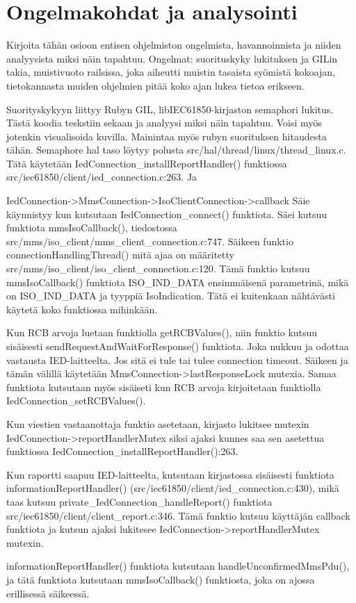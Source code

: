 \section{Ongelmakohdat ja analysointi}
\begin{it}
	Kirjoita tähän osioon entisen ohjelmiston ongelmista, havannoinnista ja niiden analyysista miksi näin tapahtuu.
	Ongelmat: suorituskyky lukituksen ja GILin takia, muistivuoto railsissa, joka aiheutti muistin tasaista syömistä kokoajan, tietokannasta muiden ohjelmien pitää koko ajan lukea tietoa erikseen.

	Suorityskykyyn liittyy Rubyn GIL, libIEC61850-kirjaston semaphori lukitus. Tästä koodia teskstiin sekaan ja analyysi miksi näin tapahtuu. Voisi myös jotenkin visualisoida kuvilla. Mainintaa myös rubyn suorituksen hitaudesta tähän.
	Semaphore hal taso löytyy polusta src/hal/thread/linux/thread\_linux.c.
	Tätä käytetään IedConnection\_installReportHandler() funktiossa src/iec61850/client/ied\_connection.c:263. Ja 

	IedConnection->MmsConnection->IsoClientConnection->callback
	Säie käynnistyy kun kutsutaan IedConnection\_connect() funktiota. Säei kutsuu funktiota mmsIsoCallback(), tiedostossa src/mms/iso\_client/mms\_client\_connection.c:747.
	Säikeen funktio connectionHandlingThread() mitä ajaa on määritetty src/mms/iso\_client/iso\_client\_connection.c:120.
	Tämä funktio kutsuu mmsIsoCallback() funktiota ISO\_IND\_DATA ensimmäisenä parametrinä, mikä on ISO\_IND\_DATA ja tyyppiä IsoIndication. Tätä ei kuitenkaan nähtävästi käytetä koko funktiossa mihinkään.

	Kun RCB arvoja luetaan funktiolla getRCBValues(), niin funktio kutsuu sisäisesti sendRequestAndWaitForResponse() funktiota. Joka nukkuu ja odottaa vastausta IED-laitteelta. Jos sitä ei tule tai tulee connection timeout. Säikeen ja tämän välillä käytetään MmsConnection->lastResponseLock mutexia. Samaa funktiota kutsutaan myös sisäiseti kun RCB arvoja kirjoitetaan funktiolla IedConnection\_setRCBValues().

	Kun viestien vastaanottaja funktio asetetaan, kirjasto lukitsee mutexin IedConnection->reportHandlerMutex siksi ajaksi kunnes saa sen asetettua funktiossa IedConnection\_installReportHandler():263.

	Kun raportti saapuu IED-laitteelta, kutsutaan kirjastossa sisäisesti funktiota informationReportHandler() (src/iec61850/client/ied\_connection.c:430), mikä taas kutsuu private\_IedConnection\_handleReport() funktiota src/iec61850/client/client\_report.c:346. Tämä funktio kutsuu käyttäjän callback funktiota ja kutsun ajaksi lukitesee IedConnection->reportHandlerMutex mutexin.
	
	informationReportHandler() funktiota kutsutaan handleUnconfirmedMmsPdu(), ja tätä funktiota kutsutaan mmsIsoCallback() funktiosta, joka on ajossa erillisessä säikeessä.
\end{it}

